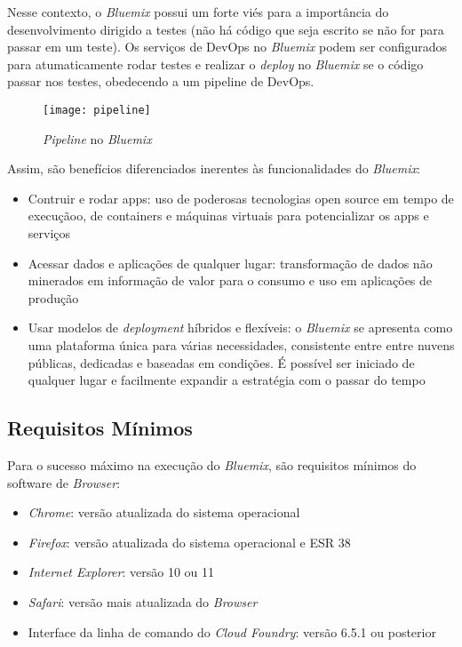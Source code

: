 Nesse contexto, o \textit{Bluemix} possui um forte viés para a importância do desenvolvimento dirigido a testes (não há código que seja escrito se não for para passar em um teste). Os serviços de DevOps no \textit{Bluemix} podem ser configurados para atumaticamente rodar testes e realizar o \textit{deploy} no \textit{Bluemix} se o código passar nos testes, obedecendo a um pipeline de DevOps.
\begin{figure}[!htb]
    \centering
    \texttt{[image: pipeline]}
    \caption{\textit{Pipeline} no \textit{Bluemix}}
    \label{Rotulo}
\end{figure}

Assim, são benefícios diferenciados inerentes às funcionalidades do \textit{Bluemix}:
\begin{itemize}
    \item	Contruir e rodar apps: uso de poderosas tecnologias open source em tempo de execuçãoo, de containers e máquinas virtuais para potencializar os apps e serviços
    \item	Acessar dados e aplicações de qualquer lugar: transformação de dados não minerados em informação de valor para o consumo e uso em aplicações de produção
    \item	Usar modelos de \textit{deployment} híbridos e flexíveis: o \textit{Bluemix} se apresenta como uma plataforma única para várias necessidades, consistente entre entre nuvens públicas, dedicadas e baseadas em condições. É possível ser iniciado de qualquer lugar e facilmente expandir a estratégia com o passar do tempo
\end{itemize}

\subsection{Requisitos Mínimos}

Para o sucesso máximo na execução do \textit{Bluemix}, são requisitos mínimos do software de \textit{Browser}:
\begin{itemize}
    \item	\textit{Chrome}: versão atualizada do sistema operacional
    \item	\textit{Firefox}: versão atualizada do sistema operacional e ESR 38
    \item	\textit{Internet Explorer}: versão 10 ou 11
    \item	\textit{Safari}: versão mais atualizada do \textit{Browser}
    \item	Interface da linha de comando do \textit{Cloud Foundry}: versão 6.5.1 ou posterior
\end{itemize}

